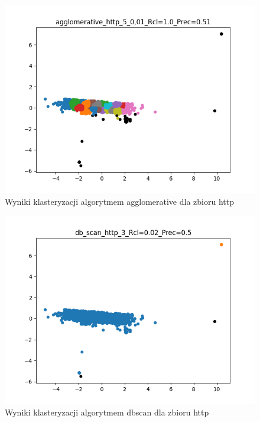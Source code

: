 \documentclass{classrep}
\begin{document}
{{            \begin{figure}[!htbp]
                \centering
                \includegraphics[width=\textwidth]{img/agglomerative_http_5_0,01_-115749.png}
                \caption
                {Wyniki klasteryzacji algorytmem agglomerative dla zbioru http}
                \label{fig:http_agglomerative}
            \end{figure}

            \begin{figure}[!htbp]
                \centering
                \includegraphics[width=\textwidth]{img/db_scan_http_3_-115804.png}
                \caption
                {Wyniki klasteryzacji algorytmem dbscan dla zbioru http}
                \label{fig:http_dbscan}
            \end{figure}

}}
\end{document}
